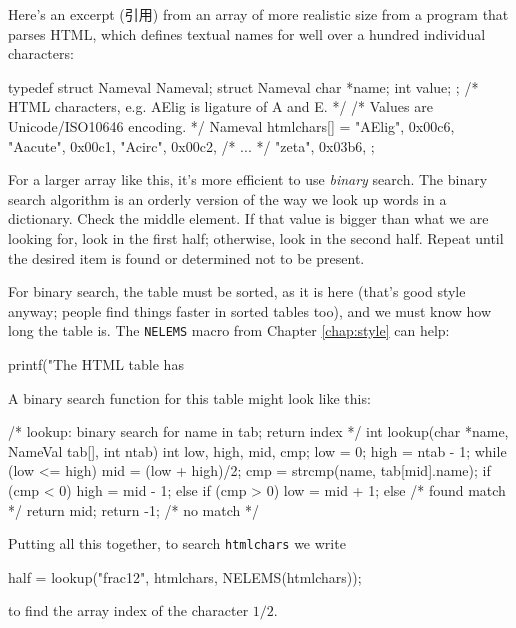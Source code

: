 Here's an excerpt (引用) from an array of more realistic size from a
program that
parses HTML, which defines textual names for well over a hundred individual
characters:
\begin{wellcode}
    typedef struct Nameval Nameval;
    struct Nameval{
        char *name;
        int value;
    };
    /* HTML characters, e.g. AElig is ligature of A and E. */
    /* Values are Unicode/ISO10646 encoding. */
    Nameval htmlchars[] = {
        "AElig",    0x00c6,
        "Aacute",   0x00c1,
        "Acirc",    0x00c2,
        /* ... */
        "zeta",     0x03b6,
    };
\end{wellcode}

For a larger array like this, it's more efficient to use
\textit{binary} search. The binary search algorithm is an orderly
version of the way we look up words in a dictionary. Check the middle
element. If that value is bigger than what we are looking for, look in the
first half; otherwise, look in the second half. Repeat until the desired
item is found or determined not to be present.

For binary search, the table must be sorted, as it is here (that's good
style anyway; people find things faster in sorted tables too), and we must
know how long the table is. The \verb'NELEMS' macro from Chapter
\ref{chap:style} can help:
\begin{wellcode}
    printf("The HTML table has %
\end{wellcode}

A binary search function for this table might look like this:
\begin{wellcode}
    /* lookup: binary search for name in tab; return index */
    int lookup(char *name, NameVal tab[], int ntab)
    {
        int low, high, mid, cmp;
        low = 0;
        high = ntab - 1;
        while (low <= high){
            mid = (low + high)/2;
            cmp = strcmp(name, tab[mid].name);
            if (cmp < 0){
                high = mid - 1;
            }
            else if (cmp > 0){
                low = mid + 1;
            }
            else{   /* found match */
                return mid;
            }
        }
        return -1;  /* no match */
    }
\end{wellcode}
Putting all this together, to search \verb'htmlchars' we write
\begin{wellcode}
    half = lookup("frac12", htmlchars, NELEMS(htmlchars));
\end{wellcode}
to find the array index of the character $1/2$.

